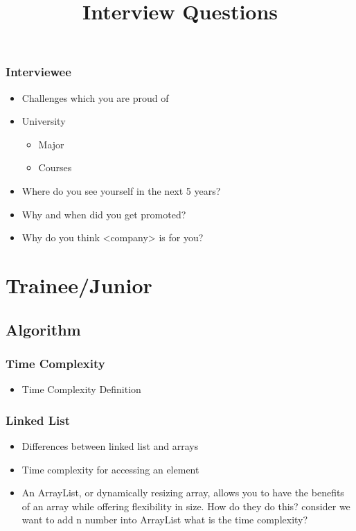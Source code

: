 \documentclass[]{book}
\begin{document}
\title{Interview Questions}

\maketitle

\subsection{Interviewee}

\begin{itemize}
  \item Challenges which you are proud of
  \item University
    \begin{itemize}
      \item Major
      \item Courses
    \end{itemize}
  \item Where do you see yourself in the next 5 years?
  \item Why and when did you get promoted?
  \item Why do you think <company> is for you?
\end{itemize}

\chapter{Trainee/Junior}

\section{Algorithm}

\subsection{Time Complexity}

\begin{itemize}
  \item Time Complexity Definition
\end{itemize}

\subsection{Linked List}

\begin{itemize}
  \item Differences between linked list and arrays
  \item Time complexity for accessing an element
  \item An ArrayList, or dynamically resizing array, allows you to have the benefits of an array while offering flexibility in size.
    How do they do this? consider we want to add n number into ArrayList what is the time complexity?
\end{itemize}
\end{document}
